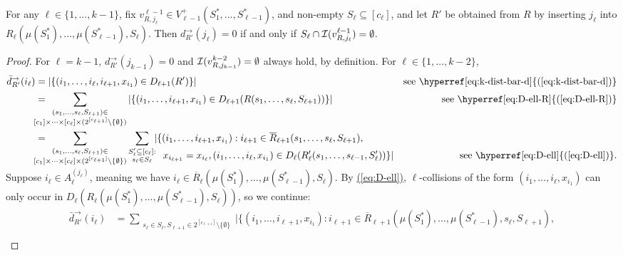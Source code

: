 \documentclass{theoretics}
\newcommand{\eq}[1]{\hyperref[eq:#1]{(\ref*{eq:#1})}}
\renewcommand{\>}{\rangle}
\newcommand{\<}{\langle}
\renewcommand{\(}{\left(}
\renewcommand{\)}{\right)}
\begin{document}
\begin{lemma}\label{lem:faults-equiv}
For any $\ell\in\{1,\dots,k-1\}$, fix $v^{\ell-1}_{R,j_{\ell}}\in V_{\ell-1}^+(S_1^*,\dots,S_{\ell-1}^*)$, and non-empty $S_{\ell}\subseteq [c_{\ell}]$, and let $R'$ be obtained from $R$ by inserting $j_{\ell}$ into $R_{\ell}(\mu(S_1^*),\dots,\mu(S_{\ell-1}^*),S_{\ell})$. Then $d^{\rightarrow}_{R'}(j_{\ell})=0$ if and only if $S_{\ell}\cap {\cal I}(v^{\ell-1}_{R,j_{\ell}})=\emptyset$. 
\end{lemma}
\begin{proof}
For $\ell=k-1$, $d_{R'}^{\rightarrow}(j_{k-1})=0$ and ${\cal I}(v^{k-2}_{R,j_{k-1}})=\emptyset$ always hold, by definition. 
For $\ell\in\{1,\dots,k-2\}$,
\begin{align*}
\bar{d}_{R'}^{\rightarrow}(i_{\ell}) &= |\{(i_1,\dots,i_{\ell},i_{\ell+1},x_{i_1})\in D_{\ell+1}(R')\}| & \mbox{see \eq{k-dist-bar-d}}\\
&= \!\!\!\!\!\!\!\!\!\sum_{\substack{(s_1,\dots,s_{\ell},S_{\ell+1})\in\\ [c_1]\times\dots\times[c_{\ell}]\times (2^{[c_{\ell+1}]}\setminus\{\emptyset\})}}
|\{(i_1,\dots,i_{\ell+1},x_{i_1})\in D_{\ell+1}(R(s_1,\dots,s_{\ell},S_{\ell+1}))\}| & \mbox{see \eq{D-ell-R}}\\
&= \!\!\!\!\!\!\!\!\!\sum_{\substack{(s_1,\dots,s_{\ell},S_{\ell+1})\in\\ [c_1]\times\dots\times[c_{\ell}]\times (2^{[c_{\ell+1}]}\setminus\{\emptyset\})}}
\sum_{\substack{S_{\ell}'\subseteq[c_{\ell}]:\\ s_{\ell}\in S_{\ell}}}\!\!
|\{(i_1,\dots,i_{\ell+1},x_{i_1}):  i_{\ell+1}\in\overline{R}_{\ell+1}(s_1,\dots,s_{\ell},S_{\ell+1}),\\[-20pt]
&\qquad\qquad\qquad\qquad\qquad\qquad\quad\, x_{i_{\ell+1}}=x_{i_{\ell}}, (i_1,\dots,i_{\ell},x_{i_1})\in D_{\ell}(R_{\ell}'(s_1,\dots,s_{\ell-1},S_{\ell}'))\}| & \mbox{see \eq{D-ell}}.
\end{align*}
Suppose $i_{\ell}\in A_{\ell}^{(j_{\ell})}$, meaning we have $i_{\ell}\in \overline{R}_{\ell}(\mu(S_1^*),\dots,\mu(S_{\ell-1}^*),S_{\ell})$. By \eq{D-ell},
$\ell$-collisions of the form $(i_1,\dots,i_{\ell},x_{i_1})$ can only occur in $D_{\ell}({R}_{\ell}(\mu(S_1^*),\dots,\mu(S_{\ell-1}^*),S_{\ell}))$, so we continue:
\begin{align*}
\bar{d}_{R'}^{\rightarrow}(i_{\ell}) &= \sum_{\substack{s_{\ell}\in S_{\ell},S_{\ell+1}\in2^{[c_{\ell+1}]}\setminus\{\emptyset\}}}
|\{(i_1,\dots,i_{\ell+1},x_{i_1}):  i_{\ell+1}\in\overline{R}_{\ell+1}(\mu(S_1^*),\dots,\mu(S_{\ell-1}^*),s_{\ell},S_{\ell+1}),\\[-17pt]

\end{align*}
\end{proof}
\end{document}
